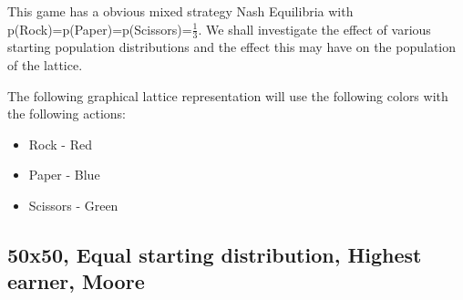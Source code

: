 \documentclass[a4paper, 11pt]{article}
\begin{document}
This game has a obvious mixed strategy Nash Equilibria with p(Rock)=p(Paper)=p(Scissors)=$\frac{1}{3}$. We shall investigate the effect of various starting population distributions and the effect this may have on the population of the lattice.

The following graphical lattice representation will use the following colors with the following actions:
\begin{itemize}[noitemsep]
  \item Rock - Red
  \item Paper - Blue
  \item Scissors - Green
\end{itemize}



\newpage
\begin{landscape}
\subsection{50x50, Equal starting distribution, Highest earner, Moore}


\end{landscape}
\end{document}
